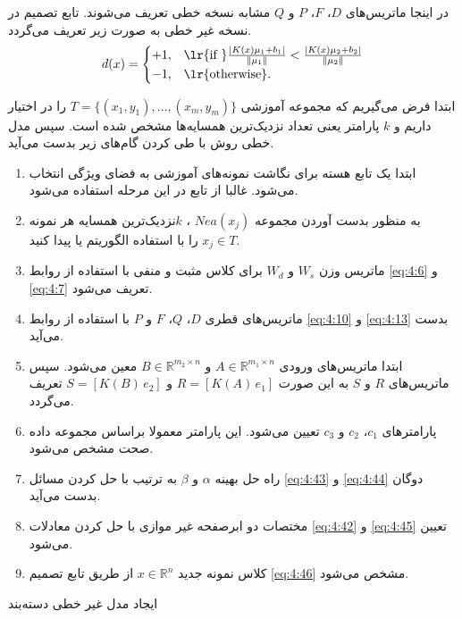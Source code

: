 در اینجا ماتریس‌های  $D$،  $F$، $P$ و $Q$ مشابه نسخه خطی تعریف می‌شوند. تابع تصمیم در نسخه غیر خطی به صورت زیر تعریف می‌گردد.
\begin{equation}\label{eq:4:46}
d(x) =
\begin{cases}
+1, & \textrm{\lr{if }} \frac{\left|{K({x})}{{\mu}_{1}}+{{b}_{1}} \right|}{\left\|\mu_1\right\|} < \frac{\left| {K({x})}{{\mu}_{2}}+{{b}_{2}} \right|}{\left\|\mu_2\right\|} \\
-1, & \textrm{\lr{otherwise}}.
\end{cases}
\end{equation}

\begin{algorithm}[!t]
\begin{steps}

	ابتدا فرض می‌گیریم که مجموعه آموزشی $T=\{(x_1, y_1),\dots,(x_m, y_m)\}$  را در اختیار داریم و $k$ پارامتر یعنی تعداد نزدیک‌ترین همسایه‌ها مشخص شده است. سپس مدل خطی روش  با طی کردن گام‌های زیر بدست می‌آید.
	
	\begin{enumerate}
		\item ابتدا یک تابع هسته برای نگاشت نمونه‌های آموزشی به فضای ویژگی انتخاب می‌شود. غالبا از تابع  در این مرحله استفاده می‌شود.
		\item به منظور بدست آوردن مجموعه $Nea(x_{j})$ ،  $k$نزدیک‌ترین همسایه هر نمونه  $x_{j} \in T$ را با استفاده الگوریتم  یا  پیدا کنید.
		\item ماتریس وزن $W_s$  و $W_d$  برای کلاس مثبت و منفی با استفاده از روابط \ref{eq:4:6} و \ref{eq:4:7}  تعریف می‌شود.
		\item ماتریس‌های قطری  $D$،  $Q$، $F$  و $P$  با استفاده از روابط \ref{eq:4:10} و \ref{eq:4:13} بدست می‌آید.
		\item ابتدا ماتریس‌های ورودی  $A \in \mathbb{R}^{m_1 \times n}$ و   $B \in \mathbb{R}^{m_2 \times n}$ معین می‌شود. سپس ماتریس‌های  $R$  و $S$  به این صورت  $R=[K(A)\,e_{1}]$ و $S=[K(B)\,e_{2}]$ تعریف می‌گردد.
		\item پارامترهای  $c_{1}$، $c_{2}$  و $c_{3}$ تعیین می‌شود. این پارامتر معمولا براساس مجموعه داده صحت مشخص می‌شود.
		\item راه حل بهینه $\alpha$  و $\beta$  به ترتیب با حل کردن مسائل \ref{eq:4:43} و \ref{eq:4:44} دوگان بدست می‌آید.
		\item مختصات دو ابرصفحه غیر موازی با حل کردن معادلات \ref{eq:4:42} و \ref{eq:4:45} تعیین می‌شود.
		\item کلاس نمونه جدید  $x \in \mathbb{R}^{n}$ از طریق تابع تصمیم \ref{eq:4:46} مشخص می‌شود.
	\end{enumerate}
\end{steps}
\caption{ایجاد مدل غیر خطی دسته‌بند }
\label{algo:nonlinear-RKNN-TSVM}
\end{algorithm}

